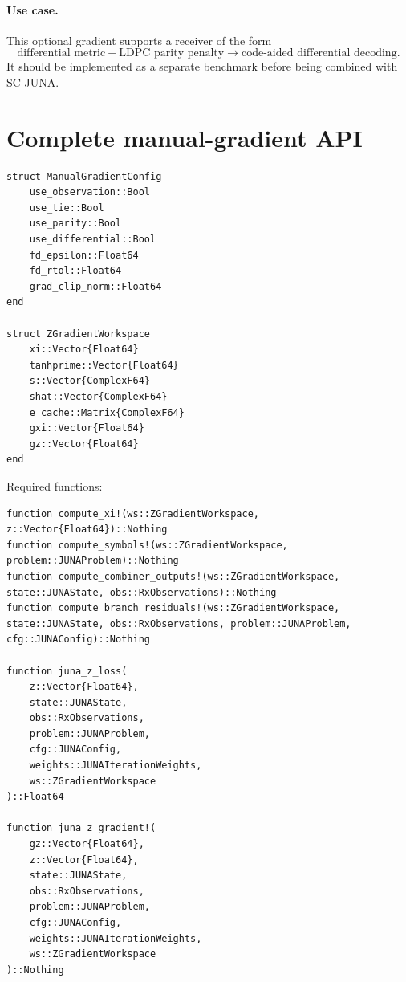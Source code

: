 \documentclass[11pt]{article}
\begin{document}
\paragraph{Use case.}
This optional gradient supports a receiver of the form
\begin{equation}
\text{differential metric}+\text{LDPC parity penalty}\rightarrow\text{code-aided differential decoding}.
\end{equation}
It should be implemented as a separate benchmark before being combined with SC-JUNA.

\section{Complete manual-gradient API}

\begin{lstlisting}
struct ManualGradientConfig
    use_observation::Bool
    use_tie::Bool
    use_parity::Bool
    use_differential::Bool
    fd_epsilon::Float64
    fd_rtol::Float64
    grad_clip_norm::Float64
end

struct ZGradientWorkspace
    xi::Vector{Float64}
    tanhprime::Vector{Float64}
    s::Vector{ComplexF64}
    shat::Vector{ComplexF64}
    e_cache::Matrix{ComplexF64}
    gxi::Vector{Float64}
    gz::Vector{Float64}
end
\end{lstlisting}

Required functions:

\begin{lstlisting}
function compute_xi!(ws::ZGradientWorkspace, z::Vector{Float64})::Nothing
function compute_symbols!(ws::ZGradientWorkspace, problem::JUNAProblem)::Nothing
function compute_combiner_outputs!(ws::ZGradientWorkspace, state::JUNAState, obs::RxObservations)::Nothing
function compute_branch_residuals!(ws::ZGradientWorkspace, state::JUNAState, obs::RxObservations, problem::JUNAProblem, cfg::JUNAConfig)::Nothing

function juna_z_loss(
    z::Vector{Float64},
    state::JUNAState,
    obs::RxObservations,
    problem::JUNAProblem,
    cfg::JUNAConfig,
    weights::JUNAIterationWeights,
    ws::ZGradientWorkspace
)::Float64

function juna_z_gradient!(
    gz::Vector{Float64},
    z::Vector{Float64},
    state::JUNAState,
    obs::RxObservations,
    problem::JUNAProblem,
    cfg::JUNAConfig,
    weights::JUNAIterationWeights,
    ws::ZGradientWorkspace
)::Nothing
\end{lstlisting}
\end{document}
